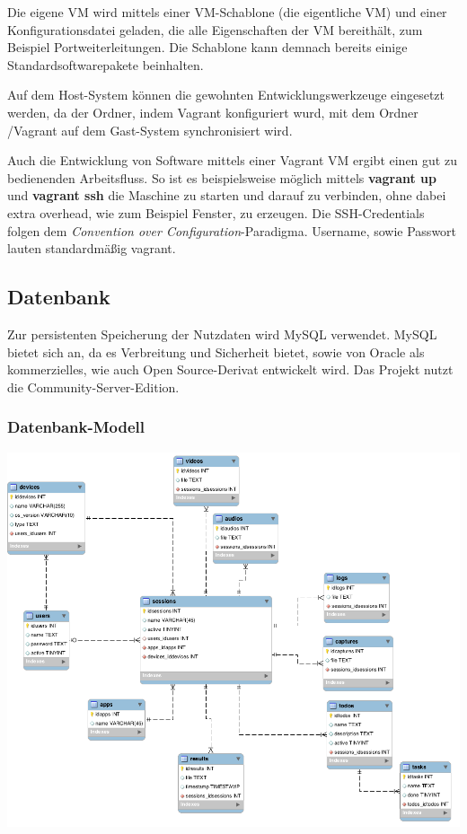 Die eigene VM wird mittels einer VM-Schablone (die eigentliche VM) und einer Konfigurationsdatei geladen, die alle Eigenschaften der VM bereithält, zum Beispiel Portweiterleitungen. Die Schablone kann demnach bereits einige Standardsoftwarepakete beinhalten. 

Auf dem Host-System können die gewohnten Entwicklungswerkzeuge eingesetzt werden, da der Ordner, indem Vagrant konfiguriert wurd, mit dem Ordner /Vagrant auf dem Gast-System synchronisiert wird. 

Auch die Entwicklung von Software mittels einer Vagrant VM ergibt einen gut zu bedienenden Arbeitsfluss. So ist es beispielsweise möglich mittels \textbf{vagrant up} und \textbf{vagrant ssh} die Maschine zu starten und darauf zu verbinden, ohne dabei extra overhead, wie zum Beispiel Fenster, zu erzeugen. Die SSH-Credentials folgen dem \textit{Convention over Configuration}-Paradigma. Username, sowie Passwort lauten standardmäßig vagrant. 


\subsection{Datenbank}

Zur persistenten Speicherung der Nutzdaten wird MySQL verwendet. MySQL bietet sich an, da es Verbreitung und Sicherheit bietet, sowie von Oracle als kommerzielles, wie auch Open Source-Derivat entwickelt wird. Das Projekt nutzt die Community-Server-Edition. 

\subsubsection{Datenbank-Modell}

\includegraphics[width=\linewidth,keepaspectratio]{img/db_model.png}

